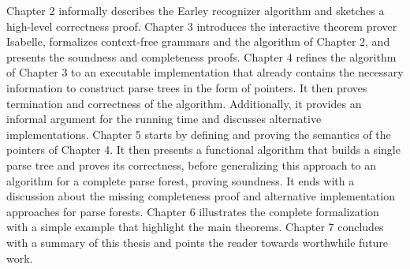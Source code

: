 \begin{isabellebody}
%
\endisatagdocument
{\isafolddocument}%
%
\isadelimdocument
%
\endisadelimdocument
%
\begin{isamarkuptext}%
Chapter 2 informally describes the Earley recognizer algorithm and sketches a high-level correctness proof.
Chapter 3 introduces the interactive theorem prover Isabelle, formalizes context-free grammars and the algorithm
  of Chapter 2, and presents the soundness and completeness proofs.
Chapter 4 refines the algorithm of Chapter 3 to an executable implementation that already contains the
  necessary information to construct parse trees in the form of pointers. It then proves termination and
  correctness of the algorithm. Additionally, it provides an informal argument for the running time and
  discusses alternative implementations.
Chapter 5 starts by defining and proving the semantics of the pointers of Chapter 4. It then presents
  a functional algorithm that builds a single parse tree and proves its correctness, before generalizing
  this approach to an algorithm for a complete parse forest, proving soundness. It ends with a discussion
  about the missing completeness proof and alternative implementation approaches for parse forests.
Chapter 6 illustrates the complete formalization with a simple example that highlight the main theorems.
Chapter 7 concludes with a summary of this thesis and points the reader towards worthwhile future work.%
\end{isamarkuptext}\isamarkuptrue%
%
\isadelimtheory
%
\endisadelimtheory
%
\isatagtheory
%
\endisatagtheory
{\isafoldtheory}%
%
\isadelimtheory
%
\endisadelimtheory
%
\end{isabellebody}%
\endinput
